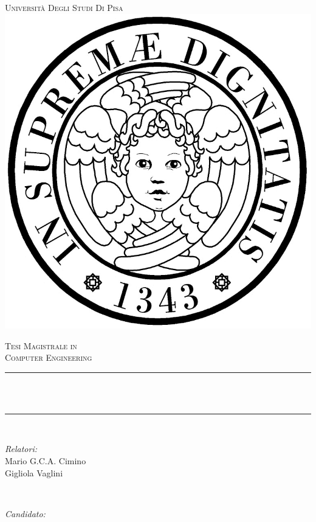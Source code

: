 \makeatletter
{}

\begin{titlepage}
    \newcommand{\HRule}{\rule{\linewidth}{0.5mm}}
    
    \center 
    \textsc{\LARGE Università Degli Studi Di Pisa }\\[0.3cm]

    \vspace{1cm}
    \includegraphics[scale=0.7]{img/logo.png}
    \vspace{1cm}
  
    \textsc{\Large Tesi Magistrale in }\\[0.5cm]
    \textsc{\Large Computer Engineering }\\[1.5cm]
  
    \HRule \\[0.4cm]
    { \huge \bfseries \@title }\\[0.03cm] 
    \HRule \\[1.5cm]
    
    \begin{minipage}{0.4\textwidth}
    \begin{flushleft} \large
    \emph{Relatori:}\\
    Mario G.C.A. Cimino\\
    Gigliola Vaglini
    \end{flushleft}
    \end{minipage}
    ~
    \begin{minipage}{0.4\textwidth}
    \begin{flushright} \large
    \emph{Candidato:} \\
    \@author \\ 
    \vspace{1.2\baselineskip}
    \end{flushright}
    \end{minipage}\\[1cm]
    
    \vfill

    {\large \@date }\\[1cm]

   
\end{titlepage}

\restoregeometry
